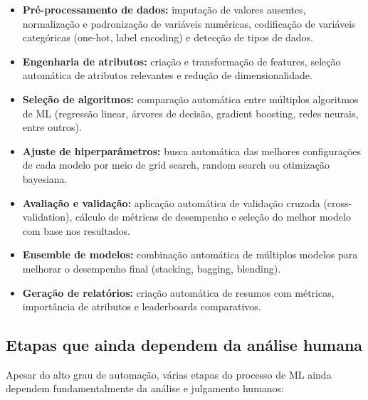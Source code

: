 \documentclass[11pt, a4paper, oneside]{article}
\begin{document}
\begin{itemize}[leftmargin=1.5cm, itemsep=4pt]
  \item \textbf{Pré-processamento de dados:} imputação de valores ausentes, normalização e padronização de variáveis numéricas, codificação de variáveis categóricas (one-hot, label encoding) e detecção de tipos de dados.
  \item \textbf{Engenharia de atributos:} criação e transformação de features, seleção automática de atributos relevantes e redução de dimensionalidade.
  \item \textbf{Seleção de algoritmos:} comparação automática entre múltiplos algoritmos de ML (regressão linear, árvores de decisão, gradient boosting, redes neurais, entre outros).
  \item \textbf{Ajuste de hiperparâmetros:} busca automática das melhores configurações de cada modelo por meio de grid search, random search ou otimização bayesiana.
  \item \textbf{Avaliação e validação:} aplicação automática de validação cruzada (cross-validation), cálculo de métricas de desempenho e seleção do melhor modelo com base nos resultados.
  \item \textbf{Ensemble de modelos:} combinação automática de múltiplos modelos para melhorar o desempenho final (stacking, bagging, blending).
  \item \textbf{Geração de relatórios:} criação automática de resumos com métricas, importância de atributos e leaderboards comparativos.
\end{itemize}

\subsection{Etapas que ainda dependem da análise humana}
\label{sec:etapas-humanas}

Apesar do alto grau de automação, várias etapas do processo de ML ainda dependem
fundamentalmente da análise e julgamento humanos:
\end{document}
